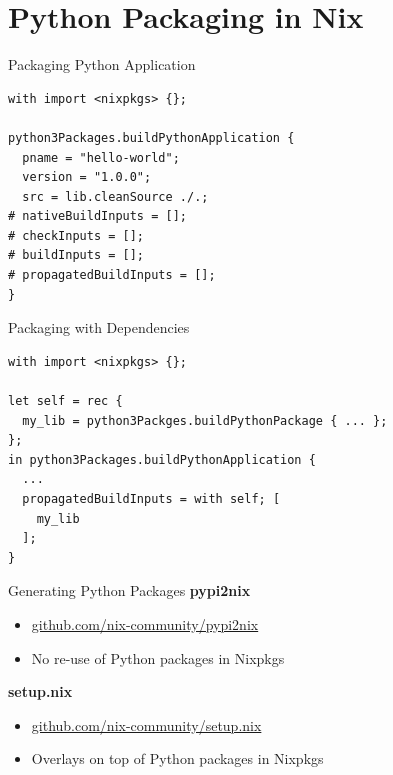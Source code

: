 \documentclass[10pt,aspectratio=169]{beamer}
\begin{document}

\section{Python Packaging in Nix}


\begin{frame}[fragile]{Packaging Python Application}
  \begin{verbatim}
with import <nixpkgs> {};

python3Packages.buildPythonApplication {
  pname = "hello-world";
  version = "1.0.0";
  src = lib.cleanSource ./.;
# nativeBuildInputs = [];
# checkInputs = [];
# buildInputs = [];
# propagatedBuildInputs = [];
}
  \end{verbatim}
\end{frame}


\begin{frame}[fragile]{Packaging with Dependencies}
  \begin{verbatim}
with import <nixpkgs> {};

let self = rec {
  my_lib = python3Packges.buildPythonPackage { ... };
};
in python3Packages.buildPythonApplication {
  ...
  propagatedBuildInputs = with self; [
    my_lib
  ];
}
  \end{verbatim}
\end{frame}


\begin{frame}[fragile]{Generating Python Packages}
  \textbf{pypi2nix}
  \begin{itemize}
    \item \href{https://github.com/nix-community/pypi2nix}{github.com/nix-community/pypi2nix}
    \item No re-use of Python packages in Nixpkgs
  \end{itemize}
  \textbf{setup.nix}
  \begin{itemize}
    \item \href{https://github.com/nix-community/setup.nix}{github.com/nix-community/setup.nix}
    \item Overlays on top of Python packages in Nixpkgs
  \end{itemize}
\end{frame}
\end{document}
